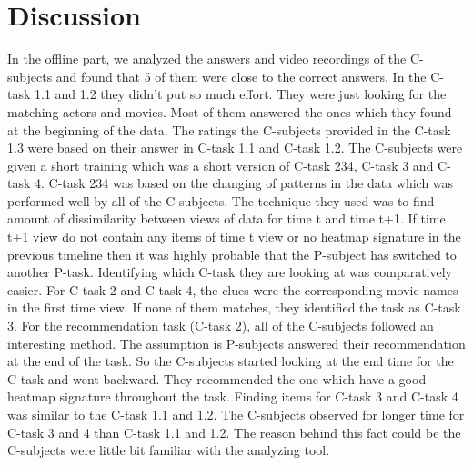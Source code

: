﻿\section{Discussion}
In the offline part, we analyzed the answers and video recordings of the C-subjects and found that 5 of them were close to the correct answers. In the C-task 1.1 and 1.2 they didn’t put so much effort. They were just looking for the matching actors and movies. Most of them answered the ones which they found at the beginning of the data. The ratings the C-subjects provided in the C-task 1.3 were based on their answer in C-task 1.1 and C-task 1.2. The C-subjects were given a short training which was a short version of C-task 234, C-task 3 and C-task 4. C-task 234 was based on the changing of patterns in the data which was performed well by all of the C-subjects. The technique they used was to find amount of dissimilarity between views of data for time t and time t+1. If time t+1 view do not contain any items of time t view or no heatmap signature in the previous timeline then it was highly probable that the P-subject has switched to another P-task.  Identifying which C-task they are looking at was comparatively easier. For C-task 2 and C-task 4, the clues were the corresponding movie names in the first time view. If none of them matches, they identified the task as C-task 3. For the recommendation task (C-task 2), all of the C-subjects followed an interesting method. The assumption is P-subjects answered their recommendation at the end of the task. So the C-subjects started looking at the end time for the C-task and went backward. They recommended the one which have a good heatmap signature throughout the task. Finding items for C-task 3 and C-task 4 was similar to the C-task 1.1 and 1.2. The C-subjects observed for longer time for C-task 3 and 4 than C-task 1.1 and 1.2. The reason behind this fact could be the C-subjects were little bit familiar with the analyzing tool. 

